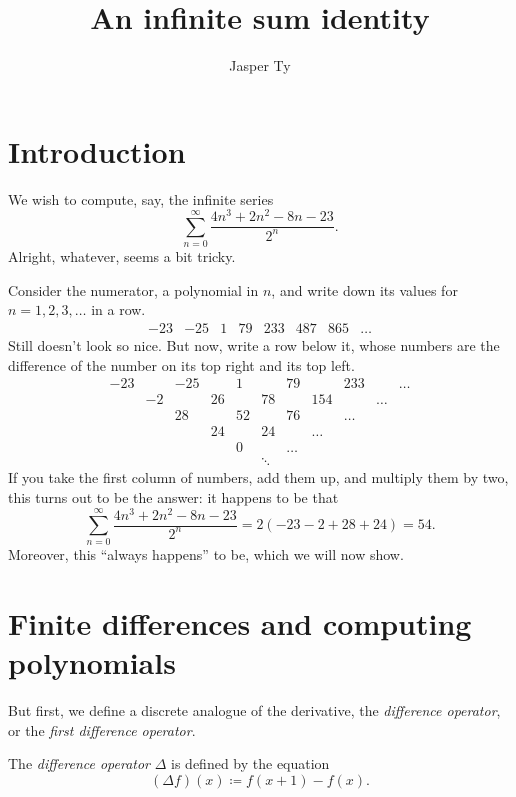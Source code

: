 \documentclass{article}
\title{An infinite sum identity}
\author{Jasper Ty}
\date{}
\begin{document}
\maketitle

\tableofcontents

\section{Introduction}

We wish to compute, say, the infinite series
\[
    \sum_{n=0}^\infty \frac{4n^3 + 2n^2 - 8n - 23}{2^n}.
\]
Alright, whatever, seems a bit tricky.

Consider the numerator, a polynomial in $n$, and write down its values for $n=1,2,3,\ldots$ in a row.
\[
    \begin{matrix}
        -23 & -25 & 1 & 79 & 233 & 487 & 865 & \ldots
    \end{matrix}
\]
Still doesn't look so nice.
But now, write a row below it, whose numbers are the difference of the number on its top right and its top left.
\[
    \begin{matrix}
        -23 & & -25 & & 1 & & 79 & & 233 & & \ldots \\
        & -2 & & 26 & & 78 & & 154 & & \ldots \\
        & & 28 & & 52 & & 76 & & \ldots \\
        & & & 24 & & 24 & & \ldots \\
        & & & & 0 & & \ldots \\
        & & & & & \ddots 
    \end{matrix}
\]
If you take the first column of numbers, add them up, and multiply them by two, this turns out to be the answer:
it happens to be that
\[
    \sum_{n=0}^\infty \frac{4n^3 + 2n^2 - 8n - 23}{2^n} = 2(-23-2+28+24) = 54.
\]
Moreover, this ``always happens'' to be, which we will now show.

\section{Finite differences and computing polynomials}

But first, we define a discrete analogue of the derivative, the \textit{difference operator}, or the \textit{first difference operator}.

\begin{definition}\label{def:differenceoperator}
    The \textit{difference operator} $\Delta$ is defined by the equation
    \[
        (\Delta f)(x) \coloneq f(x+1) - f(x).
    \]
\end{definition}
\end{document}

